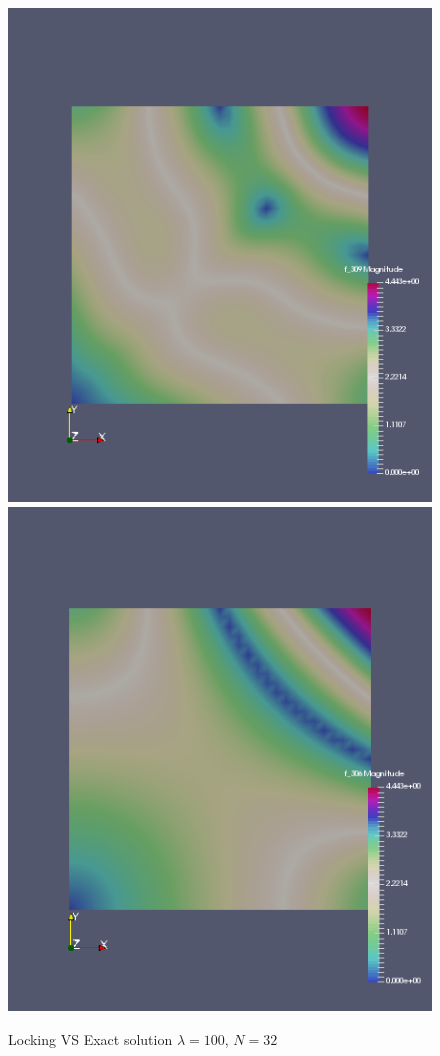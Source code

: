 \documentclass[a4paper,norsk]{article}
\begin{document}
\begin{figure}[h!]
	\centering
	\caption*{Locking VS Exact solution $\lambda = 100$, $N = 32$}
	\includegraphics[scale=0.4]{lock.png}
	\includegraphics[scale=0.4]{exnolock.png}
\end{figure}
\end{document}
